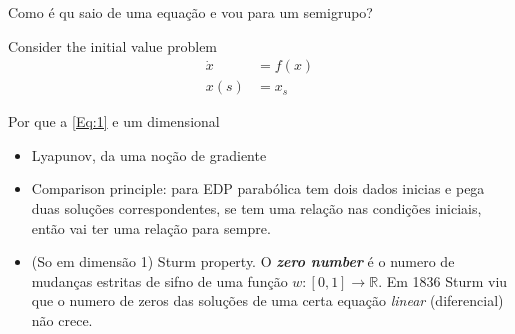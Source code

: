Como é qu saio de uma equação e vou para um semigrupo?

Consider the initial value problem
\begin{align*}
	\dot x &=f(x)\\
	x(s)&=x_s
\end{align*}

Por que a \cref{Eq:1} e um dimensional

\begin{itemize}
\item Lyapunov, da uma noção de gradiente
\item Comparison principle: para EDP parabólica tem dois dados inicias e pega duas soluções correspondentes, se tem uma relação nas condições iniciais, então vai ter uma relação para sempre.
\item (So em dimensão 1) Sturm property. O \textit{\textbf{zero number}}  é o numero de mudanças estritas de sifno de uma função $w:[0,1]\to \mathbb{R}$. Em 1836 Sturm viu que o numero de zeros das soluções de uma certa equação \textit{linear} (diferencial) não crece.
\end{itemize}

